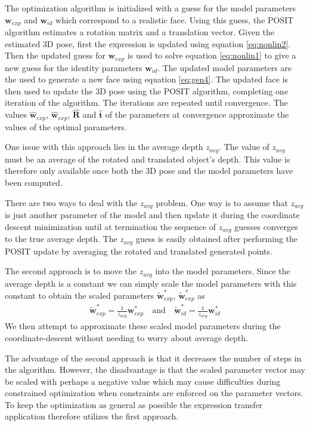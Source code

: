 \documentclass[11pt,a4paper]{report}
\begin{document}
The optimization algorithm is initialized with a guess for the
model parameters $\mathbf{w}_{exp}$ and $\mathbf{w}_{id}$ which correspond
to a realistic face. Using this guess, the POSIT algorithm estimates a rotation
matrix and a translation vector. Given the estimated 3D pose, first the
expression is updated using equation \ref{eq:nonlin2}. Then the updated guess
for $\mathbf{w}_{exp}$ is used to solve equation \ref{eq:nonlin1} to give a new
guess for the identity parameters $\mathbf{w}_{id}$. The updated model
parameters are the used to generate a new face using equation
\ref{eq:gen4}. The updated face is then used to update the 3D pose using
the POSIT algorithm, completing one iteration of the algorithm. The iterations are repeated until convergence. The values $\mathbf{\hat{w}}_{exp}$, $\mathbf{\hat{w}}_{exp}$,
$\mathbf{\hat{R}}$ and $\mathbf{\hat{t}}$ of the parameters at convergence
approximate the values of the optimal parameters.

One issue with this approach lies in the average depth $z_{avg}$. The value of
$z_{avg}$ must be an average of the rotated and translated object's depth. This
value is therefore only available once both the 3D pose and the model
parameters have been computed.

There are two ways to deal with the $z_{avg}$ problem. One way is to assume that
$z_{avg}$ is just another parameter of the model and then update it during the coordinate
descent minimization until at termination the sequence of $z_{avg}$ guesses
converges to the true average depth. The $z_{avg}$ guess is easily obtained
after performing the POSIT update by averaging the rotated and translated generated points.

The second approach is to move the $z_{avg}$ into the model parameters. Since
the average depth is a constant we can simply scale the model parameters with
this constant to obtain the scaled parameters $\mathbf{\tilde{w}}^*_{exp}$,
$\mathbf{\tilde{w}}^*_{exp}$ as
\begin{align*}
\mathbf{\tilde{w}}^*_{exp} = \frac{1}{z_{avg}}\mathbf{w}^*_{exp} \quad
\textrm{and} \quad
\mathbf{\tilde{w}}^*_{id} = \frac{1}{z_{avg}}\mathbf{w}^*_{id}
\end{align*}
We then attempt to approximate these scaled model parameters during the
coordinate-descent without needing to worry about average depth.

The advantage of the second approach is that it decreases the number of steps in
the algorithm. However, the disadvantage is that the scaled parameter vector may
be scaled with perhaps a negative value which may cause difficulties during constrained
optimization when constraints are enforced on the parameter vectors. To keep the
optimization as general as possible the expression transfer application
therefore utilizes the first approach.
\end{document}
